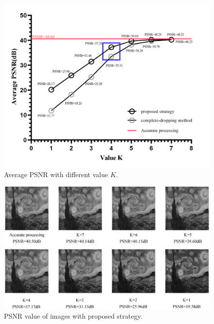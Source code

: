 \documentclass[lettersize,journal]{IEEEtran}
\begin{document}
\begin{figure}[htb]
	\centering
	\includegraphics[width=\linewidth]{Fig/Average PSNR with different K value.png}
	\caption{Average PSNR with different value $K$.}
	\label{fig9}
\end{figure}
\begin{figure}[htb]
	\centering
	\includegraphics[width=\linewidth]{Fig/PSNR value of images with proposed strategy.png}
	\caption{PSNR value of images with proposed strategy.}
	\label{fig10}
\end{figure}
\end{document}
